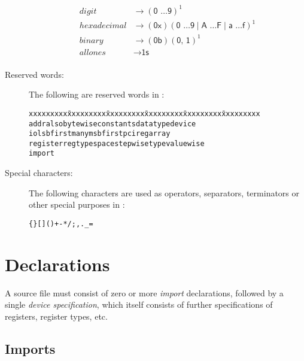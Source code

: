 \documentclass[a4paper,11pt,twoside]{report}
\begin{document}
\begin{description}
\begin{align*}
digit & \rightarrow (\textsf{0 \ldots 9})^{\textrm{1}}\\
hexadecimal & \rightarrow (\textsf{0x})(\textsf{0 \ldots 9} \mid \textsf{A \ldots F} \mid \textsf{a \ldots f})^{\textrm{1}}\\
binary & \rightarrow (\textsf{0b})(\textsf{0, 1})^{\textrm{1}}\\
allones & \rightarrow \textsf{1s}\\
\end{align*}


\item[Reserved words:] The following are reserved words in \Mac:
\begin{alltt}
  \begin{tabbing}
xxxxxxxxx \= xxxxxxxxx \= xxxxxxxxx \= xxxxxxxxx \= xxxxxxxxx \= xxxxxxxxx \kill
addr \> also \> bytewise \> constants \> datatype \> device \\
io \> lsbfirst \> many \> msbfirst \> pci \> regarray  \\
register \> regtype \> space \> stepwise \> type \> valuewise \\
import 
  \end{tabbing}
\end{alltt}

\item[Special characters:] The following characters are used as operators,
  separators, terminators or other special purposes in \Mac:
\begin{alltt}

  \{ \} [ ] ( ) + - * / ; , . _ = 

\end{alltt}

\end{description}

\chapter{Declarations}\label{chap:declarations}

A \Mac source file must consist of zero or more \textit{import}
declarations, followed by a single \textit{device
  specification}, which itself consists of further specifications of
registers, register types, etc. 

\section{Imports}\label{sec:imports}
\end{document}
